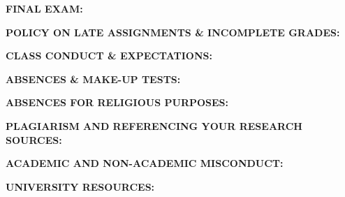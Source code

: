 \textbf{FINAL EXAM:} \\
\FinalExam

\textbf{POLICY ON LATE ASSIGNMENTS \& INCOMPLETE GRADES:}\\
\LatePolicy

\textbf{CLASS CONDUCT \& EXPECTATIONS:}\\
\ClassConduct

\textbf{ABSENCES \& MAKE-UP TESTS:}\\
\Absences

\textbf{ABSENCES FOR RELIGIOUS PURPOSES:}\\
\Religious

\textbf{PLAGIARISM AND REFERENCING YOUR RESEARCH SOURCES:}\\
\Plagiarism

\textbf{ACADEMIC AND NON-ACADEMIC MISCONDUCT:}\\
\AcaHon

\textbf{UNIVERSITY RESOURCES:}\\
\UniRes

%
%
%


